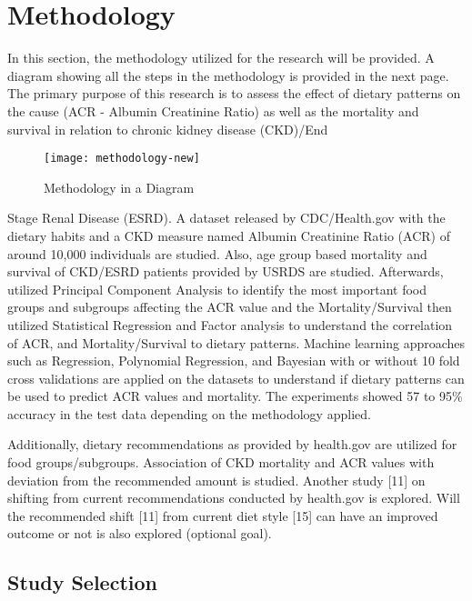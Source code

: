 \section{Methodology}
In this section, the methodology utilized for the research will be provided. A diagram showing all the steps in the methodology is provided in the next page. The primary purpose of this research is to assess the effect of dietary patterns on the cause (ACR - Albumin Creatinine Ratio) as well as the mortality and survival in relation to chronic kidney disease (CKD)/End 

\begin{figure}
\caption{Methodology in a Diagram}
\begin{center}
\texttt{[image: methodology-new]}
\end{center}
\end{figure}


\noindent Stage Renal Disease (ESRD). A dataset released by CDC/Health.gov with the dietary habits and a CKD measure named Albumin Creatinine Ratio (ACR) of around 10,000 individuals are studied. Also, age group based mortality and survival of CKD/ESRD patients provided by USRDS are studied. Afterwards, utilized Principal Component Analysis to identify the most important food groups and subgroups affecting the ACR value and the Mortality/Survival then utilized Statistical Regression and Factor analysis to understand the correlation of ACR, and Mortality/Survival to dietary patterns. Machine learning approaches such as Regression, Polynomial Regression, and Bayesian with or without 10 fold cross validations are applied on the datasets to understand if dietary patterns can be used to predict ACR values and mortality. The experiments showed 57 to 95\% accuracy in the test data depending on the methodology applied. 

\noindent Additionally, dietary recommendations as provided by health.gov are utilized for food groups/subgroups. Association of CKD mortality and ACR values with deviation from the recommended amount is studied. Another study [11] on shifting from current recommendations conducted by health.gov is explored. Will the recommended shift [11] from current diet style [15] can have an improved outcome or not is also explored (optional goal).

\subsection{Study Selection}

